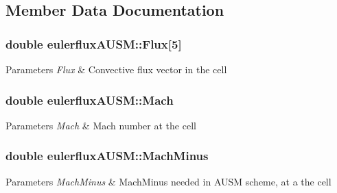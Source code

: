 \subsection{Member Data Documentation}
\subsubsection[{\texorpdfstring{Flux}{Flux}}]{\setlength{\rightskip}{0pt plus 5cm}double eulerflux\+A\+U\+S\+M\+::\+Flux\mbox{[}5\mbox{]}}\hypertarget{classeulerfluxAUSM_a46908ae326123ac416f7ae023c280060}{}\label{classeulerfluxAUSM_a46908ae326123ac416f7ae023c280060}

\begin{DoxyParams}{Parameters}
{\em Flux} & Convective flux vector in the cell \\
\hline
\end{DoxyParams}
\subsubsection[{\texorpdfstring{Mach}{Mach}}]{\setlength{\rightskip}{0pt plus 5cm}double eulerflux\+A\+U\+S\+M\+::\+Mach}\hypertarget{classeulerfluxAUSM_a7c9560ef18e086f6d3cc376c151ad2ff}{}\label{classeulerfluxAUSM_a7c9560ef18e086f6d3cc376c151ad2ff}

\begin{DoxyParams}{Parameters}
{\em Mach} & Mach number at the cell \\
\hline
\end{DoxyParams}
\subsubsection[{\texorpdfstring{Mach\+Minus}{MachMinus}}]{\setlength{\rightskip}{0pt plus 5cm}double eulerflux\+A\+U\+S\+M\+::\+Mach\+Minus}\hypertarget{classeulerfluxAUSM_a8a114564c03cd55a32e0255f9bddbd20}{}\label{classeulerfluxAUSM_a8a114564c03cd55a32e0255f9bddbd20}

\begin{DoxyParams}{Parameters}
{\em Mach\+Minus} & Mach\+Minus needed in A\+U\+SM scheme, at a the cell \\
\hline
\end{DoxyParams}
